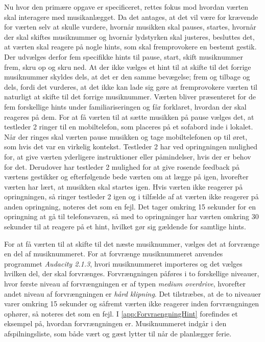 Nu hvor den primære opgave er specificeret, rettes fokus mod hvordan værten skal interagere med musikanlægget. Da det antages, at det vil være for krævende for værten selv at skulle vurdere, hvornår musikken skal pauses, startes, hvornår der skal skiftes musiknummer og hvornår lydstyrken skal justeres, besluttes det, at værten skal reagere på nogle hints, som skal fremprovokere en bestemt gestik. Der udvælges derfor fem specifikke hints til pause, start, skift musiknummer frem, skru op og skru ned. At der ikke vælges et hint til at skifte til det forrige musiknummer skyldes dels, at det er den samme bevægelse; frem og tilbage og dels, fordi det vurderes, at det ikke kan lade sig gøre at fremprovokere værten til naturligt at skifte til det forrige musiknummer. Værten bliver præsenteret for de fem forskellige hints under familiariseringen og får forklaret, hvordan der skal reageres på dem. For at få værten til at sætte musikken på pause vælges det, at testleder 2 ringer til en mobiltelefon, som placeres på et sofabord inde i lokalet. Når der ringes skal værten pause musikken og tage mobiltelefonen op til øret, som hvis det var en virkelig kontekst. Testleder 2 har ved opringningen mulighed for, at give værten yderligere instruktioner eller påmindelser, hvis der er behov for det. Derudover har testleder 2 mulighed for at give rosende feedback på værtens gestikker og efterfølgende bede værten om at lægge på igen, hvorefter værten har lært, at musikken skal startes igen. Hvis værten ikke reagerer på opringningen, så ringer testleder 2 igen og i tilfælde af at værten ikke reagerer på anden opringning, noteres det som en fejl. Det tager omkring 15 sekunder for en opringning at gå til telefonsvaren, så med to opringninger har værten omkring 30 sekunder til at reagere på et hint, hvilket gør sig gældende for samtlige hints. 

For at få værten til at skifte til det næste musiknummer, vælges det at forvrænge en del af musiknummeret. For at forvrænge musiknummeret anvendes programmet \textit{Audacity 2.1.3}, hvori musiknummeret importeres og det vælges hvilken del, der skal forvrænges. Forvrængningen påføres i to forskellige niveauer, hvor første niveau af forvrængningen er af typen \textit{medium overdrive}, hvorefter andet niveau af forvrængningen er \textit{hård klipning}. Det tilstræbes, at de to niveauer varer omkring 15 sekunder og såfremt værten ikke reagerer inden forvrængningen ophører, så noteres det som en fejl. I \autoref{app:ForvraengningHint} forefindes et eksempel på, hvordan forvrængningen er. Musiknummeret indgår i den afspilningsliste, som både vært og gæst lytter til når de planlægger ferie. 


